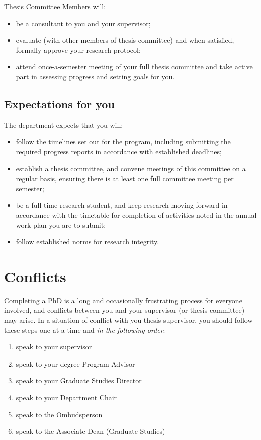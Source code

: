 \documentclass[
  openany]{book}
\providecommand{\tightlist}{%
  \setlength{\itemsep}{0pt}\setlength{\parskip}{0pt}}
\begin{document}
Thesis Committee Members will:

\begin{itemize}
\tightlist
\item
  be a consultant to you and your supervisor;
\item
  evaluate (with other members of thesis committee) and when satisfied, formally approve your research protocol;
\item
  attend once-a-semester meeting of your full thesis committee and take active part in assessing progress and setting goals for you.
\end{itemize}

\hypertarget{expectations-for-you}{%
\subsection{Expectations for you}\label{expectations-for-you}}

The department expects that you will:

\begin{itemize}
\tightlist
\item
  follow the timelines set out for the program, including submitting the required progress reports in accordance with established deadlines;
\item
  establish a thesis committee, and convene meetings of this committee on a regular basis, ensuring there is at least one full committee meeting per semester;
\item
  be a full-time research student, and keep research moving forward in accordance with the timetable for completion of activities noted in the annual work plan you are to submit;
\item
  follow established norms for research integrity.
\end{itemize}

\hypertarget{conflicts}{%
\section{Conflicts}\label{conflicts}}

Completing a PhD is a long and occasionally frustrating process for everyone involved, and conflicts between you and your supervisor (or thesis committee) may arise. In a situation of conflict with you thesis supervisor, you should follow these steps one at a time and \emph{in the following order}:

\begin{enumerate}
\def\labelenumi{\arabic{enumi}.}
\tightlist
\item
  speak to your supervisor
\item
  speak to your degree Program Advisor
\item
  speak to your Graduate Studies Director
\item
  speak to your Department Chair
\item
  speak to the Ombudsperson
\item
  speak to the Associate Dean (Graduate Studies)
\end{enumerate}
\end{document}
